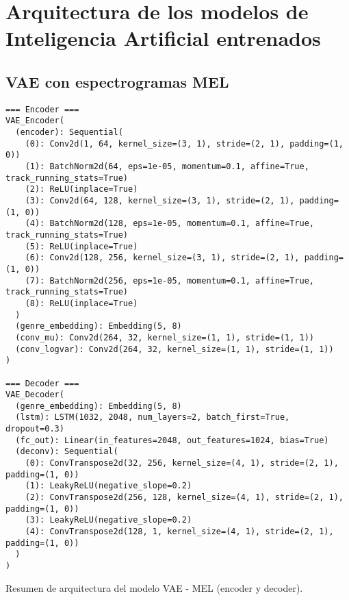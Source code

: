 \chapter{Arquitectura de los modelos de Inteligencia Artificial entrenados}
\label{appendix-b}
\section{VAE con espectrogramas MEL}

\begin{table}[H]
\centering
\begin{minipage}{0.95\textwidth}
\begin{lstlisting}[basicstyle=\scriptsize\ttfamily]
=== Encoder ===
VAE_Encoder(
  (encoder): Sequential(
    (0): Conv2d(1, 64, kernel_size=(3, 1), stride=(2, 1), padding=(1, 0))
    (1): BatchNorm2d(64, eps=1e-05, momentum=0.1, affine=True, track_running_stats=True)
    (2): ReLU(inplace=True)
    (3): Conv2d(64, 128, kernel_size=(3, 1), stride=(2, 1), padding=(1, 0))
    (4): BatchNorm2d(128, eps=1e-05, momentum=0.1, affine=True, track_running_stats=True)
    (5): ReLU(inplace=True)
    (6): Conv2d(128, 256, kernel_size=(3, 1), stride=(2, 1), padding=(1, 0))
    (7): BatchNorm2d(256, eps=1e-05, momentum=0.1, affine=True, track_running_stats=True)
    (8): ReLU(inplace=True)
  )
  (genre_embedding): Embedding(5, 8)
  (conv_mu): Conv2d(264, 32, kernel_size=(1, 1), stride=(1, 1))
  (conv_logvar): Conv2d(264, 32, kernel_size=(1, 1), stride=(1, 1))
)

=== Decoder ===
VAE_Decoder(
  (genre_embedding): Embedding(5, 8)
  (lstm): LSTM(1032, 2048, num_layers=2, batch_first=True, dropout=0.3)
  (fc_out): Linear(in_features=2048, out_features=1024, bias=True)
  (deconv): Sequential(
    (0): ConvTranspose2d(32, 256, kernel_size=(4, 1), stride=(2, 1), padding=(1, 0))
    (1): LeakyReLU(negative_slope=0.2)
    (2): ConvTranspose2d(256, 128, kernel_size=(4, 1), stride=(2, 1), padding=(1, 0))
    (3): LeakyReLU(negative_slope=0.2)
    (4): ConvTranspose2d(128, 1, kernel_size=(4, 1), stride=(2, 1), padding=(1, 0))
  )
)

\end{lstlisting}
\end{minipage}
\caption{Resumen de arquitectura del modelo VAE - MEL (encoder y decoder).}
\label{tab:vae_mel_model_summary}
\end{table}

